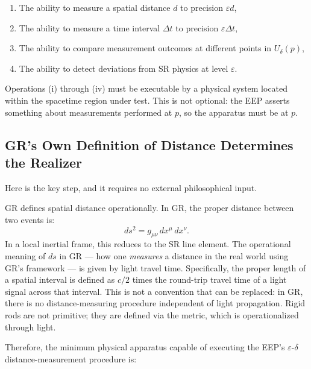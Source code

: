 \documentclass[11pt,a4paper]{article}
\begin{document}
\begin{enumerate}[label=(\roman*)]
\item The ability to measure a spatial distance $d$ to precision $\varepsilon d$,
\item The ability to measure a time interval $\Delta t$ to precision $\varepsilon \Delta t$,
\item The ability to compare measurement outcomes at different points in $U_\delta(p)$,
\item The ability to detect deviations from SR physics at level $\varepsilon$.
\end{enumerate}

Operations (i) through (iv) must be executable by a physical system located within
the spacetime region under test. This is not optional: the EEP asserts something
about measurements performed at $p$, so the apparatus must be at $p$.

\subsection{GR's Own Definition of Distance Determines the Realizer}

Here is the key step, and it requires no external philosophical input.

GR defines spatial distance operationally. In GR, the proper distance between two
events is:
\[
ds^2 = g_{\mu\nu}\,dx^\mu\,dx^\nu.
\]
In a local inertial frame, this reduces to the SR line element. The operational
meaning of $ds$ in GR --- how one \emph{measures} a distance in the real world using
GR's framework --- is given by light travel time. Specifically, the proper length of
a spatial interval is defined as $c/2$ times the round-trip travel time of a light
signal across that interval. This is not a convention that can be replaced: in GR,
there is no distance-measuring procedure independent of light propagation. Rigid rods
are not primitive; they are defined via the metric, which is operationalized through
light.

Therefore, the minimum physical apparatus capable of executing the EEP's
$\varepsilon$-$\delta$ distance-measurement procedure is:
\end{document}
